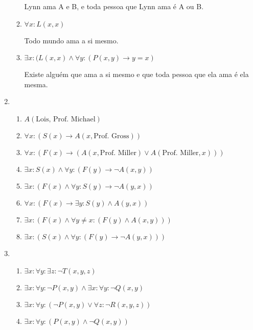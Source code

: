 \documentclass{article}
\begin{document}
\begin{enumerate}
\begin{enumerate}
                Lynn ama A e B, e toda pessoa que Lynn ama é A ou B.

            \item \( \forall x : L(x,x) \)

                Todo mundo ama a si mesmo.

            \item \( \exists x : (L(x,x) \land \forall y : (P(x,y) \to y = x) \)

                Existe alguém que ama a si mesmo e que toda pessoa que ela ama é ela mesma.
        \end{enumerate}

    \item 
        \begin{enumerate}
            \item \( A(\textrm{Lois, Prof. Michael}) \)
            \item \( \forall x : (S(x) \to A(x,\textrm{Prof. Gross}))\)
            \item \( \forall x : (F(x) \to (A(x,\textrm{Prof. Miller}) \lor A(\textrm{Prof. Miller},x))) \)
            \item \( \exists x : S(x) \land \forall y : (F(y) \to \neg A(x,y)) \)
            \item \( \exists x : (F(x) \land \forall y : S(y) \to \neg A(y,x)) \)
            \item \( \forall x : (F(x) \to \exists y : S(y) \land A(y,x)) \)
            \item \( \exists x : (F(x) \land \forall y \neq x : (F(y) \land A(x,y)))\)
            \item \( \exists x : (S(x) \land \forall y : (F(y) \to \neg A(y,x))) \)
        \end{enumerate}

    \item 
        \begin{enumerate}
            \item \( \exists x : \forall y : \exists z : \neg T(x,y,z) \)
            \item \( \exists x : \forall y : \neg P(x,y) \land \exists x : \forall y : \neg Q(x,y) \)
            \item \( \exists x : \forall y : ( \neg P(x,y) \lor \forall z : \neg R(x,y,z)) \)
            \item \( \exists x : \forall y : (P(x,y) \land \neg Q(x,y)) \)
        \end{enumerate}


\end{enumerate}
\end{document}
